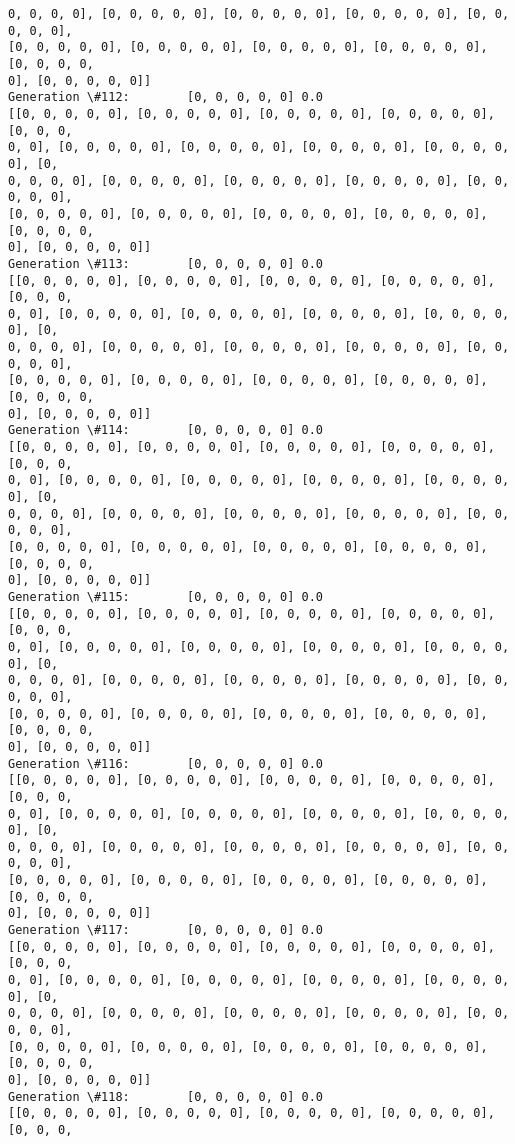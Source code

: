 \documentclass[11pt]{article}
\begin{document}
\begin{Verbatim}[commandchars=\\\{\}]
0, 0, 0, 0], [0, 0, 0, 0, 0], [0, 0, 0, 0, 0], [0, 0, 0, 0, 0], [0, 0, 0, 0, 0],
[0, 0, 0, 0, 0], [0, 0, 0, 0, 0], [0, 0, 0, 0, 0], [0, 0, 0, 0, 0], [0, 0, 0, 0,
0], [0, 0, 0, 0, 0]]
Generation \#112:        [0, 0, 0, 0, 0] 0.0
[[0, 0, 0, 0, 0], [0, 0, 0, 0, 0], [0, 0, 0, 0, 0], [0, 0, 0, 0, 0], [0, 0, 0,
0, 0], [0, 0, 0, 0, 0], [0, 0, 0, 0, 0], [0, 0, 0, 0, 0], [0, 0, 0, 0, 0], [0,
0, 0, 0, 0], [0, 0, 0, 0, 0], [0, 0, 0, 0, 0], [0, 0, 0, 0, 0], [0, 0, 0, 0, 0],
[0, 0, 0, 0, 0], [0, 0, 0, 0, 0], [0, 0, 0, 0, 0], [0, 0, 0, 0, 0], [0, 0, 0, 0,
0], [0, 0, 0, 0, 0]]
Generation \#113:        [0, 0, 0, 0, 0] 0.0
[[0, 0, 0, 0, 0], [0, 0, 0, 0, 0], [0, 0, 0, 0, 0], [0, 0, 0, 0, 0], [0, 0, 0,
0, 0], [0, 0, 0, 0, 0], [0, 0, 0, 0, 0], [0, 0, 0, 0, 0], [0, 0, 0, 0, 0], [0,
0, 0, 0, 0], [0, 0, 0, 0, 0], [0, 0, 0, 0, 0], [0, 0, 0, 0, 0], [0, 0, 0, 0, 0],
[0, 0, 0, 0, 0], [0, 0, 0, 0, 0], [0, 0, 0, 0, 0], [0, 0, 0, 0, 0], [0, 0, 0, 0,
0], [0, 0, 0, 0, 0]]
Generation \#114:        [0, 0, 0, 0, 0] 0.0
[[0, 0, 0, 0, 0], [0, 0, 0, 0, 0], [0, 0, 0, 0, 0], [0, 0, 0, 0, 0], [0, 0, 0,
0, 0], [0, 0, 0, 0, 0], [0, 0, 0, 0, 0], [0, 0, 0, 0, 0], [0, 0, 0, 0, 0], [0,
0, 0, 0, 0], [0, 0, 0, 0, 0], [0, 0, 0, 0, 0], [0, 0, 0, 0, 0], [0, 0, 0, 0, 0],
[0, 0, 0, 0, 0], [0, 0, 0, 0, 0], [0, 0, 0, 0, 0], [0, 0, 0, 0, 0], [0, 0, 0, 0,
0], [0, 0, 0, 0, 0]]
Generation \#115:        [0, 0, 0, 0, 0] 0.0
[[0, 0, 0, 0, 0], [0, 0, 0, 0, 0], [0, 0, 0, 0, 0], [0, 0, 0, 0, 0], [0, 0, 0,
0, 0], [0, 0, 0, 0, 0], [0, 0, 0, 0, 0], [0, 0, 0, 0, 0], [0, 0, 0, 0, 0], [0,
0, 0, 0, 0], [0, 0, 0, 0, 0], [0, 0, 0, 0, 0], [0, 0, 0, 0, 0], [0, 0, 0, 0, 0],
[0, 0, 0, 0, 0], [0, 0, 0, 0, 0], [0, 0, 0, 0, 0], [0, 0, 0, 0, 0], [0, 0, 0, 0,
0], [0, 0, 0, 0, 0]]
Generation \#116:        [0, 0, 0, 0, 0] 0.0
[[0, 0, 0, 0, 0], [0, 0, 0, 0, 0], [0, 0, 0, 0, 0], [0, 0, 0, 0, 0], [0, 0, 0,
0, 0], [0, 0, 0, 0, 0], [0, 0, 0, 0, 0], [0, 0, 0, 0, 0], [0, 0, 0, 0, 0], [0,
0, 0, 0, 0], [0, 0, 0, 0, 0], [0, 0, 0, 0, 0], [0, 0, 0, 0, 0], [0, 0, 0, 0, 0],
[0, 0, 0, 0, 0], [0, 0, 0, 0, 0], [0, 0, 0, 0, 0], [0, 0, 0, 0, 0], [0, 0, 0, 0,
0], [0, 0, 0, 0, 0]]
Generation \#117:        [0, 0, 0, 0, 0] 0.0
[[0, 0, 0, 0, 0], [0, 0, 0, 0, 0], [0, 0, 0, 0, 0], [0, 0, 0, 0, 0], [0, 0, 0,
0, 0], [0, 0, 0, 0, 0], [0, 0, 0, 0, 0], [0, 0, 0, 0, 0], [0, 0, 0, 0, 0], [0,
0, 0, 0, 0], [0, 0, 0, 0, 0], [0, 0, 0, 0, 0], [0, 0, 0, 0, 0], [0, 0, 0, 0, 0],
[0, 0, 0, 0, 0], [0, 0, 0, 0, 0], [0, 0, 0, 0, 0], [0, 0, 0, 0, 0], [0, 0, 0, 0,
0], [0, 0, 0, 0, 0]]
Generation \#118:        [0, 0, 0, 0, 0] 0.0
[[0, 0, 0, 0, 0], [0, 0, 0, 0, 0], [0, 0, 0, 0, 0], [0, 0, 0, 0, 0], [0, 0, 0,

\end{Verbatim}
\end{document}
